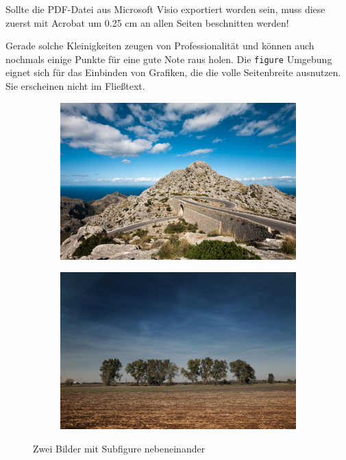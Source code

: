 Sollte die PDF-Datei aus Microsoft Visio exportiert worden sein, muss diese zuerst mit Acrobat um 0.25 cm an allen Seiten beschnitten werden!

Gerade solche Kleinigkeiten zeugen von Professionalität und können auch nochmals einige Punkte für eine gute Note raus holen. Die \texttt{figure} Umgebung eignet sich für das Einbinden von Grafiken, die die volle Seitenbreite ausnutzen. Sie erscheinen nicht im Fließtext.

\begin{figure}
	\begin{subfigure}[c]{0.49\textwidth}
		\includegraphics[width=\textwidth]{content/08_instructions/images/b1.jpg}
	\end{subfigure}
	\begin{subfigure}[c]{0.49\textwidth}
		\includegraphics[width=\textwidth]{content/08_instructions/images/b2.jpg}
	\end{subfigure}
	\caption{Zwei Bilder mit Subfigure nebeneinander}
\end{figure}

